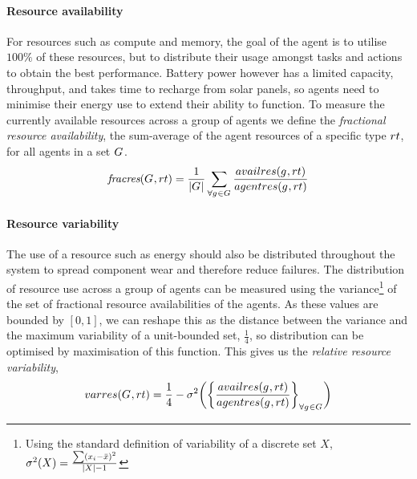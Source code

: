 \paragraph{Resource availability}
\label{section:problem:resource_availability}
\newcommand{\functionResourceAvailableSymbol}[2]{
	\functionSymbol{\textit{fracres}}}
\newcommand{\functionResourceAvailable}[2]{
	\functionSignature{\functionResourceAvailableSymbol{}{}}
	{\setAgents{#1}{}, \varResourceType{#2}{}}
}
\newcommand{\functionResourceVariabilitySymbol}[2]{\functionSymbol{varres}{#1}{#2}}
\newcommand{\functionResourceVariability}[2]{
	\functionSignature{\functionResourceVariabilitySymbol{}{}}
	{\setAgents{#1}{}, \varResourceType{#2}{}}
}

\newcommand{\functionTaskPathEnergyVariability}[2]{
	\functionSignature{\functionResourceVariabilitySymbol{}{}}
	{\functionTaskArc{}{}, \varResourceTypeEnergy{}{}}
}
For resources such as compute and memory, the goal of the agent is to utilise $100\%$ of these resources, but to distribute their usage amongst tasks and actions to obtain the best performance. Battery power however has a limited capacity, throughput, and takes time to recharge from solar panels, so agents need to minimise their energy use to extend their ability to function. To measure the currently available resources across a group of agents we define the \textit{fractional resource availability}, the sum-average of the agent resources of a specific type $\varResourceType{}{}$, for all agents in a set $G_{}^{}$.
\begin{equation}
	\functionResourceAvailable{}{} 
	= \frac{1}{\funcSize{\setAgents{}{}}}
		\sum_{\forall \varAgent{}{} \in \setAgents{}{}} 
		\frac
		{\functionAgentAvailableResources{}{}}
		{\functionAgentResources{}{}}
\end{equation}

\paragraph{Resource variability}
\label{section:problem:resource_variability}
The use of a resource such as energy should also be distributed throughout the system to spread component wear and therefore reduce failures. The distribution of resource use across a group of agents can be measured using the variance\footnote{Using the standard definition of variability of a discrete set $X$, $\sigma^2(X) = \frac{\sum (x_i - \bar{x})^2}{\lvert X \rvert-1}$} of the set of fractional resource availabilities of the agents. As these values are bounded by $[0, 1]$, we can reshape this as the distance between the variance and the maximum variability of a unit-bounded set, $\frac{1}{4}$, so distribution can be optimised by maximisation of this function. This gives us the \textit{relative resource variability},
\begin{equation}     	
	\functionResourceVariability{}{} 
	= \frac{1}{4} - \sigma^2 
	\bigg(
	\bigg\lbrace \frac
		{\functionAgentAvailableResources{}{}}
		{\functionAgentResources{}{}}
	\bigg\rbrace_{\forall \varAgent{}{} \in \setAgents{}{}}
	\bigg)
\end{equation}

